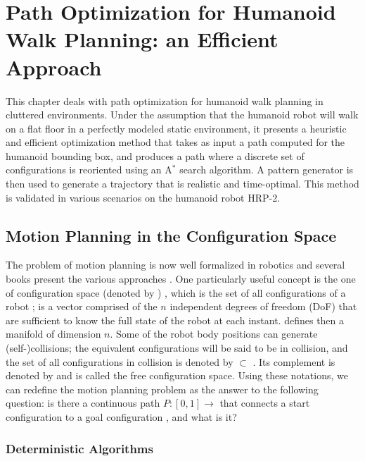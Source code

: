 \chapter{Path Optimization for Humanoid Walk Planning: an Efficient Approach}
\label{chap:path-optim}

This chapter deals with path optimization for humanoid walk planning
in cluttered environments. Under the assumption that the humanoid
robot will walk on a flat floor in a perfectly modeled static
environment, it presents a heuristic and efficient optimization method
that takes as input a path computed for the humanoid bounding box, and
produces a path where a discrete set of configurations is reoriented
using an A$^{*}$ search algorithm. A pattern generator is then used to
generate a trajectory that is realistic and time-optimal. This method
is validated in various scenarios on the humanoid robot HRP-2.

\section{Motion Planning in the Configuration Space}
\label{sec:chap1-motion-planning}

The problem of motion planning is now well formalized in robotics and
several books present the various approaches
\cite{lato91,chos05,lava06}. One particularly useful concept is the
one of configuration space (denoted by {\cspace}) \cite{loza83}, which
is the set of all configurations \config{} of a robot {\robot};
\config{} is a vector comprised of the $n$ independent degrees of
freedom (DoF) that are sufficient to know the full state of the robot
at each instant. {\cspace} defines then a manifold of dimension
$n$. Some of the robot body positions can generate (self-)collisions;
the equivalent configurations will be said to be in collision, and the
set of all configurations in collision is denoted by {\cobs} $\subset$
{\cspace}. Its complement is denoted by {\cfree} and is called the
free configuration space. Using these notations, we can redefine the
motion planning problem as the answer to the following question: is
there a continuous path $P: [0,1] \rightarrow$ {\cfree} that connects
a start configuration  to a goal configuration ,
and what is it?

\subsection{Deterministic Algorithms}
\label{subsec:chap1-deterministic algorithms}

